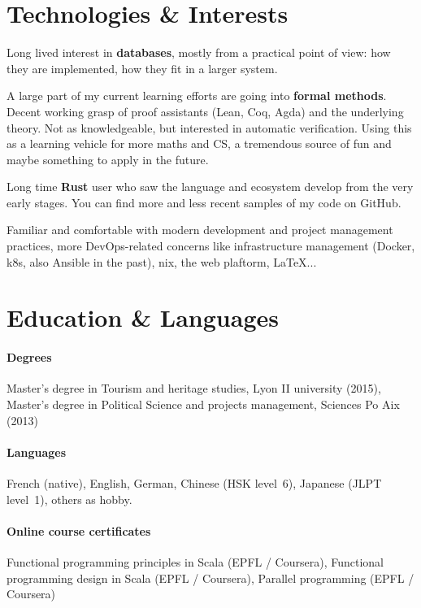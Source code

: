 \documentclass[10pt]{article}
\newcommand{\setparskip}{\setlength{\parskip}{.3em}}
\begin{document}
\begin{minipage}[t]{0.42\textwidth}
  \setparskip
  \section*{Technologies \& Interests}

  Long lived interest in \textbf{databases}, mostly from a practical point of
  view: how they are implemented, how they fit in a larger system.

  A large part of my current learning efforts are going into \textbf{formal
    methods}. Decent working grasp of proof assistants (Lean, Coq, Agda) and the
  underlying theory.  Not as knowledgeable, but interested in automatic
  verification. Using this as a learning vehicle for more maths and CS, a
  tremendous source of fun and maybe something to apply in the future.

  Long time \textbf{Rust} user who saw the language and ecosystem develop
  from the very early stages. You can find more and less recent samples of my
  code on GitHub.

  Familiar and comfortable with modern development and project management
  practices, more DevOps-related concerns like infrastructure management
  (Docker, k8s, also Ansible in the past), nix, the web plaftorm, \LaTeX...

  \section*{Education \& Languages}

  \paragraph{Degrees} Master's degree in Tourism and heritage studies, Lyon II university (2015), Master's degree in Political Science and projects management, Sciences Po Aix (2013)

  \vspace{-1em}

  \paragraph{Languages} French (native), English, German, Chinese (HSK level~6), Japanese (JLPT level~1), others as hobby.

  \vspace{-1em}

  \paragraph{Online course certificates} Functional programming principles in Scala (EPFL / Coursera), Functional programming design in Scala (EPFL / Coursera), Parallel programming (EPFL / Coursera)

\end{minipage}
\end{document}
